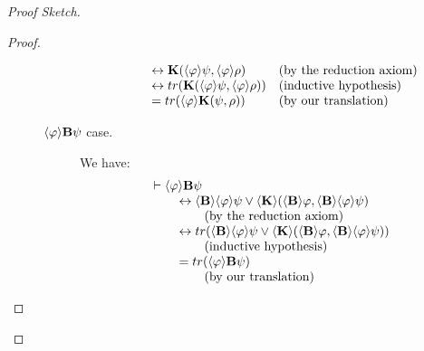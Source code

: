 \documentclass[letterpaper]{article}
\theoremstyle{definition}
\newenvironment{sketch}{\begin{proof}[Proof Sketch]}{\end{proof}}
\newcommand{\proves}{\vdash}
\newcommand{\Believe}[1]{\textrm{\textup{\textbf{B}}} #1}
\newcommand{\Know}[2]{\textrm{\textup{\textbf{K}}}(#1, #2)}
\newcommand{\diaBelieve}[1]{\langle \textrm{\textup{\textbf{B}}} \rangle #1}
\newcommand{\diaKnow}[2]{\langle \textrm{\textup{\textbf{K}}} \rangle(#1, #2)}
\newcommand{\diaHebbop}[1]{\langle #1\rangle}
\begin{document}
\begin{sketch}
\begin{proof}
\begin{description}
\begin{description}
\[\begin{array}{ll}
                    \quad \quad \leftrightarrow
                    \Know{\diaHebbop{\varphi} \psi}{\diaHebbop{\varphi} \rho}
                    & (\mbox{by the reduction axiom}) \\

                    \quad \quad \leftrightarrow
                    tr(\Know{\diaHebbop{\varphi} \psi}{\diaHebbop{\varphi} \rho})
                    & (\mbox{inductive hypothesis}) \\

                    \quad \quad =
                    tr(\diaHebbop{\varphi} \Know{\psi}{\rho})
                    & (\mbox{by our translation})
                \end{array}
                \]
                
                \item[$\diaHebbop{\varphi} \Believe{\psi}$ case.] We have:
                \[
                \begin{array}{l}
                    \proves \diaHebbop{\varphi} \Believe{\psi}\\

                    \quad \quad \leftrightarrow
                    \diaBelieve{\diaHebbop{\varphi} \psi \lor \diaKnow{\diaBelieve{\varphi}}{\diaBelieve{\diaHebbop{\varphi} \psi}}}\\
                    
                    \quad \quad \quad \quad (\mbox{by the reduction axiom}) \\

                    \quad \quad \leftrightarrow
                    tr(\diaBelieve{\diaHebbop{\varphi} \psi \lor \diaKnow{\diaBelieve{\varphi}}{\diaBelieve{\diaHebbop{\varphi} \psi}}})\\
                    
                    \quad \quad \quad \quad (\mbox{inductive hypothesis}) \\

                    \quad \quad =
                    tr(\diaHebbop{\varphi} \Believe{\psi})\\
                    
                    \quad \quad \quad \quad (\mbox{by our translation})
                \end{array}
                \]
                

\end{description}
\end{description}
\end{proof}
\end{sketch}
\end{document}
